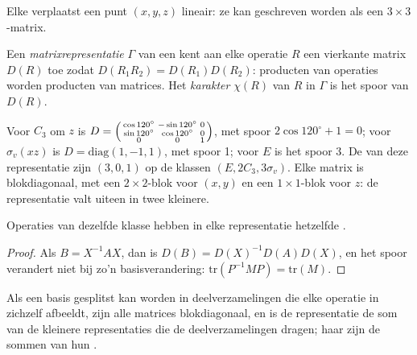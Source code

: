 Elke  verplaatst een punt $(x, y, z)$ lineair: ze kan
geschreven worden als een $3\times3$-matrix.

\begin{definition}\label{def:b3:point-groups:representation}
Een \emph{matrixrepresentatie} $\Gamma$ van een
 kent aan elke operatie $R$ een vierkante matrix $D(R)$ toe zodat
$D(R_1R_2) = D(R_1)D(R_2)$: producten van operaties worden producten van
matrices. Het \emph{karakter} $\chi(R)$ van $R$ in $\Gamma$ is
het spoor van $D(R)$.
\end{definition}

\begin{example}\label{ex:b3:point-groups:xyz}
Voor $C_3$ om $z$ is $D = \begin{psmallmatrix}\cos120^\circ & -\sin120^\circ &
0\\ \sin120^\circ & \cos120^\circ & 0\\ 0 & 0 & 1\end{psmallmatrix}$, met spoor
$2\cos120^\circ + 1 = 0$; voor $\sigma_v(xz)$ is $D = \mathrm{diag}(1, -1, 1)$, met
spoor 1; voor $E$ is het spoor 3. De  van deze representatie zijn $(3, 0, 1)$ op
de klassen $(E, 2C_3, 3\sigma_v)$. Elke matrix is blokdiagonaal, met een
$2\times2$-blok voor $(x, y)$ en een $1\times1$-blok voor $z$: de
representatie valt uiteen in twee kleinere.
\end{example}

\begin{proposition}\label{prop:b3:point-groups:class-characters}
Operaties van dezelfde klasse hebben in elke representatie hetzelfde .
\end{proposition}

\begin{proof}
Als $B = X^{-1}AX$, dan is $D(B) = D(X)^{-1}D(A)D(X)$, en het spoor verandert
niet bij zo'n basisverandering: $\mathrm{tr}(P^{-1}MP) = \mathrm{tr}(M)$.
\end{proof}

\begin{proposition}\label{prop:b3:point-groups:direct-sum}
Als een basis gesplitst kan worden in deelverzamelingen die elke operatie
in zichzelf afbeeldt, zijn alle matrices blokdiagonaal, en is de
representatie de som van de kleinere representaties die de
deelverzamelingen dragen; haar  zijn de sommen van hun .
\end{proposition}

